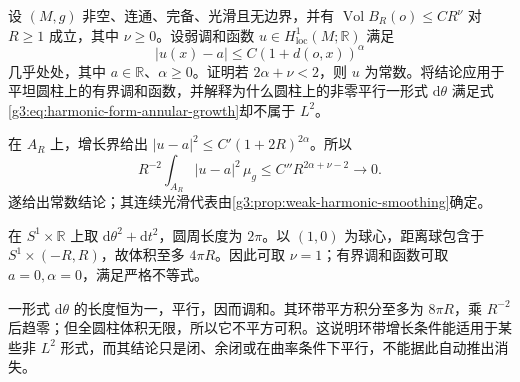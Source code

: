 \begin{exercise}\label{g3:ex:subquadratic-harmonic-growth}
	设 \((M,g)\) 非空、连通、完备、光滑且无边界，并有
	\(\operatorname{Vol}B_R(o)\le CR^\nu\) 对 \(R\ge1\) 成立，其中 \(\nu\ge0\)。设弱调和函数 \(u\in H^1_{\mathrm{loc}}(M;\mathbb R)\) 满足
	\[
		|u(x)-a|\le C(1+d(o,x))^\alpha
	\]
	几乎处处，其中 \(a\in\mathbb R\)、\(\alpha\ge0\)。证明若 \(2\alpha+\nu<2\)，则 \(u\) 为常数。将结论应用于平坦圆柱上的有界调和函数，并解释为什么圆柱上的非零平行一形式 \(\mathrm d\theta\) 满足式\eqref{g3:eq:harmonic-form-annular-growth}却不属于 \(L^2\)。
\end{exercise}
\begin{solution}
	在 \(A_R\) 上，增长界给出 \(|u-a|^2\le C'(1+2R)^{2\alpha}\)。所以
	\[
		R^{-2}\int_{A_R}|u-a|^2\,\mu_g
		\le C''R^{2\alpha+\nu-2}\longrightarrow0.
	\]
	遂给出常数结论；其连续光滑代表由\cref{g3:prop:weak-harmonic-smoothing}确定。

	在 \(S^1\times\mathbb R\) 上取 \(\mathrm d\theta^2+\mathrm dt^2\)，圆周长度为 \(2\pi\)。以 \((1,0)\) 为球心，距离球包含于 \(S^1\times(-R,R)\)，故体积至多 \(4\pi R\)。因此可取 \(\nu=1\)；有界调和函数可取 \(a=0,\alpha=0\)，满足严格不等式。

	一形式 \(\mathrm d\theta\) 的长度恒为一，平行，因而调和。其环带平方积分至多为 \(8\pi R\)，乘 \(R^{-2}\) 后趋零；但全圆柱体积无限，所以它不平方可积。这说明环带增长条件能适用于某些非 \(L^2\) 形式，而其结论只是闭、余闭或在曲率条件下平行，不能据此自动推出消失。
\end{solution}

